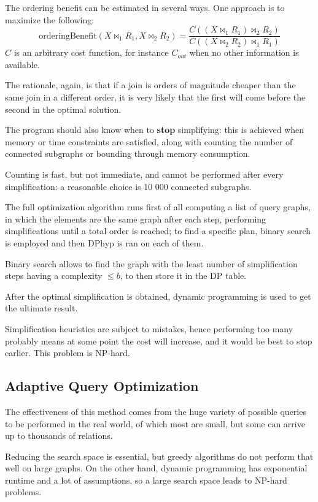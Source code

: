The ordering benefit can be estimated in several ways. One approach is to maximize the following:
$$\text{orderingBenefit}(X \bowtie_1 R_1, X \bowtie_2 R_2) = \frac{C((X \bowtie_1 R_1) \bowtie_2 R_2)}{C((X \bowtie_2 R_2) \bowtie_1 R_1)}$$
$C$ is an arbitrary cost function, for instance $C_{out}$ when no other information is available.

The rationale, again, is that if a join is orders of magnitude cheaper than the same join in a different order, it is very likely that the first will come before the second in the optimal solution.

The program should also know when to \textbf{stop} simplifying: this is achieved when memory or time constraints are satisfied, along with counting the number of connected subgraphs or bounding through memory consumption.

Counting is fast, but not immediate, and cannot be performed after every simplification: a reasonable choice is 10 000 connected subgraphs.

The full optimization algorithm runs first of all computing a list of query graphs, in which the elements are the same graph after each step, performing simplifications until a total order is reached; to find a specific plan, binary search is employed and then DPhyp is ran on each of them.

Binary search allows to find the graph with the least number of simplification steps having a complexity $\leq b$, to then store it in the DP table. 

After the optimal simplification is obtained, dynamic programming is used to get the ultimate result.

Simplification heuristics are subject to mistakes, hence performing too many probably means at some point the cost will increase, and it would be best to stop earlier. This problem is NP-hard.

\subsection{Adaptive Query Optimization}
The effectiveness of this method comes from the huge variety of possible queries to be performed in the real world, of which most are small, but some can arrive up to thousands of relations.

Reducing the search space is essential, but greedy algorithms do not perform that well on large graphs. On the other hand, dynamic programming has exponential runtime and a lot of assumptions, so a large search space leads to NP-hard problems. 

